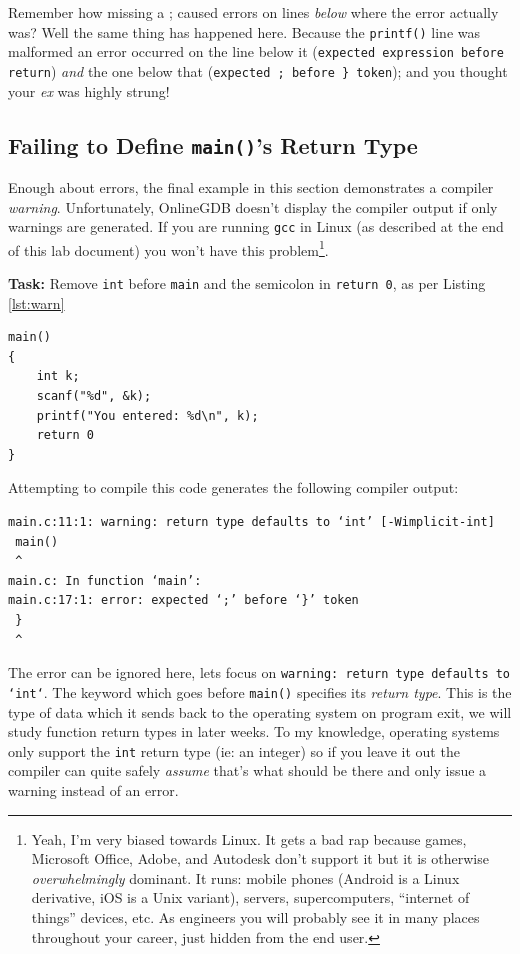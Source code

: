 \documentclass{lab}
\begin{document}
Remember how missing a ; caused errors on lines \textit{below} where the error actually was? Well the same thing has happened here. Because the \texttt{printf()} line was malformed an error occurred on the line below it (\texttt{expected expression before return}) \textit{and} the one below that (\texttt{expected ; before \} token}); and you thought your \textit{ex} was highly strung!

\pagebreak

\subsection{Failing to Define \texttt{main()}'s Return Type}

Enough about errors, the final example in this section demonstrates a compiler \textit{warning}. Unfortunately, OnlineGDB doesn't display the compiler output if only warnings are generated. If you are running \texttt{gcc} in Linux (as described at the end of this lab document) you won't have this problem\footnote{Yeah, I'm very biased towards Linux. It gets a bad rap because games, Microsoft Office, Adobe, and Autodesk don't support it but it is otherwise \textit{overwhelmingly} dominant. It runs: mobile phones (Android is a Linux derivative, iOS is a Unix variant), servers, supercomputers, ``internet of things'' devices, etc. As engineers you will probably see it in many places throughout your career, just hidden from the end user.}.

\textbf{Task:} Remove \texttt{int} before \texttt{main} and the semicolon in \texttt{return 0}, as per Listing \ref{lst:warn}

\begin{lstlisting}[style=CStyle,caption=Example code which generates a warning.,label=lst:warn]
main()
{
    int k;
    scanf("%d", &k);
    printf("You entered: %d\n", k);
    return 0
}
\end{lstlisting}

Attempting to compile this code generates the following compiler output:

\begin{lstlisting}[basicstyle=\ttfamily]
main.c:11:1: warning: return type defaults to ‘int’ [-Wimplicit-int]
 main()
 ^
main.c: In function ‘main’:
main.c:17:1: error: expected ‘;’ before ‘}’ token
 }
 ^
\end{lstlisting}

The error can be ignored here, lets focus on \texttt{warning: return type defaults to `int`}. The keyword which goes before \texttt{main()} specifies its \textit{return type}. This is the type of data which it sends back to the operating system on program exit, we will study function return types in later weeks. To my knowledge, operating systems only support the \texttt{int} return type (ie: an integer) so if you leave it out the compiler can quite safely \textit{assume} that's what should be there and only issue a warning instead of an error.
\end{document}
